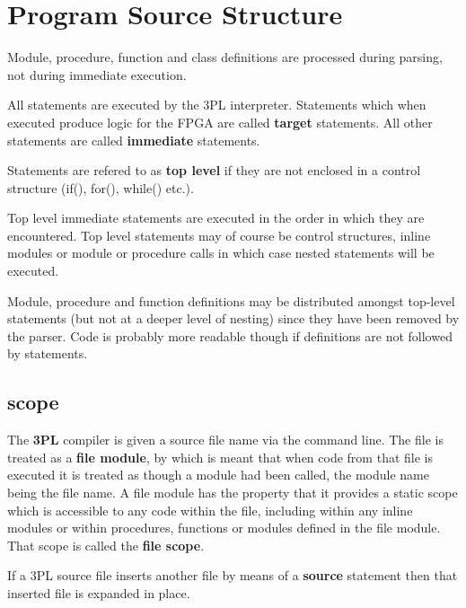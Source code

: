 \pagebreak

\chapter{Program Source Structure}\label{chap:progsrcstruct}
    
    Module, procedure, function and class definitions are processed during
    parsing, not during immediate execution.

    All statements are executed by the 3PL interpreter. Statements which when
    executed produce logic for the FPGA are called {\bf target} statements. All
    other statements are called {\bf immediate} statements.

    Statements are refered to as {\bf top level} if they are
    not enclosed in a control structure (if(), for(), while() etc.).

    Top level immediate statements are executed in the order in which they are
    encountered. Top level statements may of course be control structures,
    inline modules or module or procedure calls in which case nested
    statements will be executed.
    
    Module, procedure and function definitions may be distributed amongst
    top-level statements (but not at a deeper level of nesting) since they have
    been removed by the parser. Code is probably more readable though if
    definitions are not followed by statements.
    

    \section{scope}

        The {\bf 3PL} compiler is given a source file name via the command line.
        The file is treated as a {\bf file module}, by which is meant that when
        code from that file is executed it is treated as though a module had
        been called, the module name being the file name. A file module has the
        property that it provides a static scope which is accessible to any code
        within the file, including within any inline modules or within
        procedures, functions or modules defined in the file module. That scope
        is called the {\bf file scope}.

        If a 3PL source file inserts another file by means of a {\bf source}
        statement then that inserted file is expanded in place.


